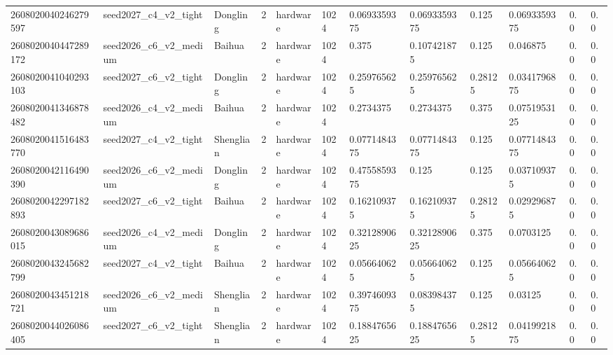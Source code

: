 \begin{tabular}{llllllllllll}
2608020040246279597 & seed2027\_c4\_v2\_tight & Dongling & 2 & hardware & 1024 & 0.0693359375 & 0.0693359375 & 0.125 & 0.0693359375 & 0.0 & 0.0 \\
2608020040447289172 & seed2026\_c6\_v2\_medium & Baihua & 2 & hardware & 1024 & 0.375 & 0.107421875 & 0.125 & 0.046875 & 0.0 & 0.0 \\
2608020041040293103 & seed2027\_c6\_v2\_tight & Dongling & 2 & hardware & 1024 & 0.259765625 & 0.259765625 & 0.28125 & 0.0341796875 & 0.0 & 0.0 \\
2608020041346878482 & seed2026\_c4\_v2\_medium & Baihua & 2 & hardware & 1024 & 0.2734375 & 0.2734375 & 0.375 & 0.0751953125 & 0.0 & 0.0 \\
2608020041516483770 & seed2027\_c4\_v2\_tight & Shenglian & 2 & hardware & 1024 & 0.0771484375 & 0.0771484375 & 0.125 & 0.0771484375 & 0.0 & 0.0 \\
2608020042116490390 & seed2026\_c6\_v2\_medium & Dongling & 2 & hardware & 1024 & 0.4755859375 & 0.125 & 0.125 & 0.037109375 & 0.0 & 0.0 \\
2608020042297182893 & seed2027\_c6\_v2\_tight & Baihua & 2 & hardware & 1024 & 0.162109375 & 0.162109375 & 0.28125 & 0.029296875 & 0.0 & 0.0 \\
2608020043089686015 & seed2026\_c4\_v2\_medium & Dongling & 2 & hardware & 1024 & 0.3212890625 & 0.3212890625 & 0.375 & 0.0703125 & 0.0 & 0.0 \\
2608020043245682799 & seed2027\_c4\_v2\_tight & Baihua & 2 & hardware & 1024 & 0.056640625 & 0.056640625 & 0.125 & 0.056640625 & 0.0 & 0.0 \\
2608020043451218721 & seed2026\_c6\_v2\_medium & Shenglian & 2 & hardware & 1024 & 0.3974609375 & 0.083984375 & 0.125 & 0.03125 & 0.0 & 0.0 \\
2608020044026086405 & seed2027\_c6\_v2\_tight & Shenglian & 2 & hardware & 1024 & 0.1884765625 & 0.1884765625 & 0.28125 & 0.0419921875 & 0.0 & 0.0 \\
\bottomrule
\end{tabular}
